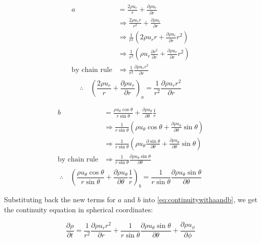 \documentclass[12pt, letterpaper, twoside]{article}
\begin{document}
    \begin{align*}
        \boxed{a} & = \frac{2 \rho u_r}{r} + \frac{\partial \rho u_r}{\partial r} \\
        & \Rightarrow \frac{2 \rho u_r r}{r^2} + \frac{\partial \rho u_r}{\partial r} \\
        & \Rightarrow \frac{1}{r^2} \left(2\rho u_r r + \frac{\partial \rho u_r}{\partial r} r^2 \right) \\
        & \Rightarrow \frac{1}{r^2} \left(\rho u_r \frac{\partial r^2}{\partial r} + \frac{\partial \rho u_r}{\partial r} r^2 \right) \\
        \text{by chain rule}& \Rightarrow \frac{1}{r^2}  \frac{\partial \rho u_r r^2}{\partial r} \\
    \end{align*}
%
    \begin{equation}\label{eq:terma}
        \therefore\quad
        \left(\frac{2 \rho u_r}{r} + \frac{\partial \rho u_r}{\partial r} \right)_a = \frac{1}{r^2}  \frac{\partial \rho u_r r^2}{\partial r} 
    \end{equation}

    \begin{align*}
        \boxed{b} & = \frac{\rho u_{\theta} \cos\theta}{r \sin\theta} + \frac{\partial\rho u_{\theta}}{\partial\theta} \frac{1}{r} \\
        & \Rightarrow \frac{1}{r\sin\theta} \left(\rho u_{\theta} \cos\theta + \frac{\partial\rho u_{\theta}}{\partial\theta} \sin\theta \right) \\
        & \Rightarrow \frac{1}{r\sin\theta} \left(\rho u_{\theta} \frac{\partial\sin\theta}{\partial\theta} + \frac{\partial\rho u_{\theta}}{\partial\theta} \sin\theta \right) \\
        \text{by chain rule}& \Rightarrow \frac{1}{r\sin\theta} \frac{\partial\rho u_{\theta} \sin\theta}{\partial\theta}  \\
    \end{align*}
%
    \begin{equation}\label{eq:termb}
        \therefore\quad
        \left(\frac{\rho u_{\theta} \cos\theta}{r \sin\theta} + \frac{\partial\rho u_{\theta}}{\partial\theta} \frac{1}{r} \right)_b =
        \frac{1}{r\sin\theta} \frac{\partial\rho u_{\theta} \sin\theta}{\partial\theta} 
    \end{equation}

    Substituting back the new terms for \(\boxed{a}\) and \(\boxed{b}\) into \ref{eq:continuitywithaandb}, we get the continuity equation in spherical coordinates:

    \begin{equation}
        \boxed{\frac{\partial \rho}{\partial t}  =
        \frac{1}{r^2}  \frac{\partial \rho u_r r^2}{\partial r} +
        \frac{1}{r\sin\theta} \frac{\partial\rho u_{\theta} \sin\theta}{\partial\theta} 
        + \frac{\partial \rho u_{\phi}}{\partial \phi} }
    \end{equation}
\end{document}
